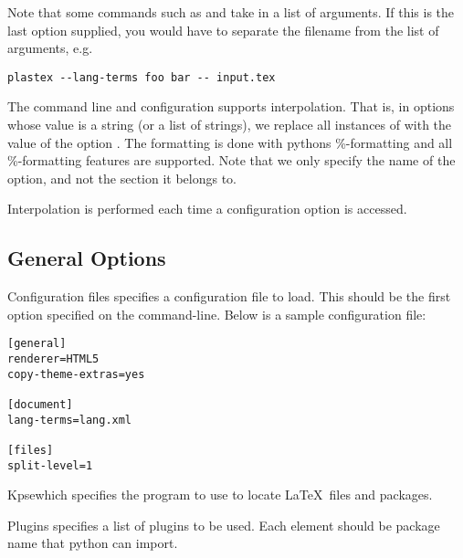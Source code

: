 Note that some commands such as  and
 take in a list of arguments. If this is the last
option supplied, you would have to separate the filename from the list of
arguments, e.g.
\begin{verbatim}
plastex --lang-terms foo bar -- input.tex
\end{verbatim}

The  command line and configuration supports interpolation.
That is, in options whose value is a string (or a list of strings), we replace
all instances of  with the value of the option . The
formatting is done with pythons \%-formatting and all \%-formatting features
are supported. Note that we only specify the name of the option, and not the
section it belongs to.

Interpolation is performed each time a configuration option is accessed.

\subsection{General Options}\label{sec:general-options}

\begin{configuration}{Configuration files}
specifies a configuration file to load.  This should be the first option
specified on the command-line. Below is a sample configuration file:
\begin{verbatim}
[general]
renderer=HTML5
copy-theme-extras=yes

[document]
lang-terms=lang.xml

[files]
split-level=1
\end{verbatim}
\end{configuration}

\begin{configuration}{Kpsewhich}
specifies the  program to use to locate \LaTeX\
files and packages.
\end{configuration}

\begin{configuration}{Plugins}
specifies a list of plugins to be used. Each element should be package
name that python can import.
\end{configuration}

